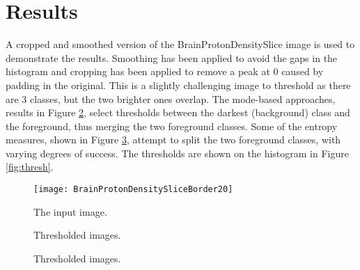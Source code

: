 \documentclass{InsightArticle}
\begin{document}
\section{Results}
A cropped and smoothed version of the BrainProtonDensitySlice image is used to demonstrate the results. Smoothing has been applied to avoid the gaps in the histogram and cropping has been applied to remove a peak at 0 caused by padding in the original. This is a slightly challenging image to threshold as there are 3 classes, but the two brighter ones overlap. The mode-based approaches, results in Figure \ref{fig:bpdthreshA}, select thresholds between the darkest (background) class and the foreground, thus merging the two foreground classes. Some of the entropy measures, shown in Figure \ref{fig:bpdthreshB}, attempt to split the two foreground classes, with varying degrees of success. The thresholds are shown on the histogram in Figure \ref{fig:thresh}.

\begin{figure}[htbp]
\centering
\texttt{[image: BrainProtonDensitySliceBorder20]}
\caption{The input image.\label{fig:bpd}}
\end{figure}

\begin{figure}[htbp]
\centering
{}

\caption{Thresholded images.\label{fig:bpdthreshA}}
\end{figure}

\begin{figure}[htbp]
\centering
{}

\caption{Thresholded images.\label{fig:bpdthreshB}}
\end{figure}
\end{document}
